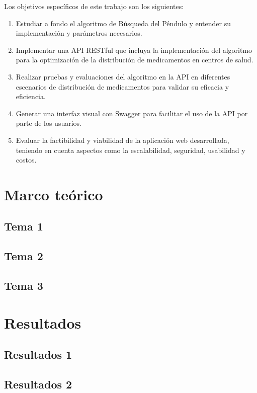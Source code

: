 \documentclass[conference]{IEEEtran}
\begin{document}
Los objetivos específicos de este trabajo son los siguientes:
\begin{enumerate}
    \item Estudiar a fondo el algoritmo de Búsqueda del Péndulo y entender su implementación y parámetros necesarios.
    \item Implementar una API RESTful que incluya la implementación del algoritmo para la optimización de la distribución de medicamentos en centros de salud.
    \item Realizar pruebas y evaluaciones del algoritmo en la API en diferentes escenarios de distribución de medicamentos para validar su eficacia y eficiencia.
    \item Generar una interfaz visual con Swagger para facilitar el uso de la API por parte de los usuarios.
    \item Evaluar la factibilidad y viabilidad de la aplicación web desarrollada, teniendo en cuenta aspectos como la escalabilidad, seguridad, usabilidad y costos.
\end{enumerate}

\section{Marco teórico}
\label{sec:MT}
\subsection{Tema 1}

\subsection{Tema 2}

\subsection{Tema 3}

\section{Resultados}
\label{sec:Res}
\subsection{Resultados 1}

\subsection{Resultados 2}
\end{document}
